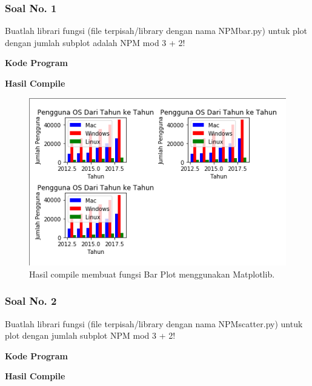 \subsubsection{Soal No. 1}
\hfill \break
Buatlah librari fungsi (file terpisah/library dengan nama NPMbar.py) untuk plot dengan jumlah subplot adalah NPM mod 3 + 2!

\hfill \break
\textbf{Kode Program}



\hfill \break
\textbf{Hasil Compile}

\begin{figure}[H]
	\includegraphics[width=12cm]{figures/6/1154016/praktek/p1.png}
	\centering
	\caption{Hasil compile membuat fungsi Bar Plot menggunakan Matplotlib.}
\end{figure}

\subsubsection{Soal No. 2}
\hfill \break
Buatlah librari fungsi (file terpisah/library dengan nama NPMscatter.py) untuk plot dengan jumlah subplot NPM mod 3 + 2!

\hfill \break
\textbf{Kode Program}



\hfill \break
\textbf{Hasil Compile}

